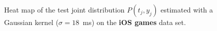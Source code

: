 \documentclass[10pt,a4paper,notitlepage,twocolumn]{article}
\begin{document}
\begin{figure}
\caption{Heat map of the test joint distribution $P(t_j,y_j)$ estimated with a Gaussian kernel ($\sigma=18$~ms) on the {\bf iOS games} data set.}
\label{fig:ios_2d}
\end{figure}
\end{document}
